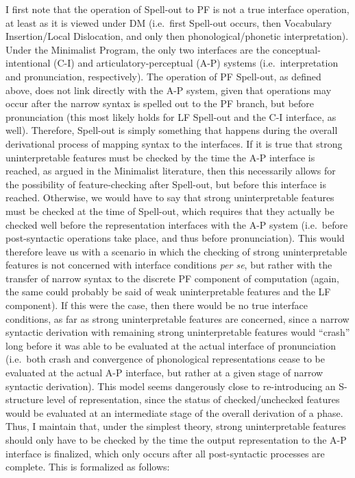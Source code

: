 I first note that the operation of Spell-out to PF is not a true interface operation, at least as it is viewed under DM (i.e.\ first Spell-out occurs, then Vocabulary Insertion/Local Dislocation, and only then phonological/phonetic interpretation). Under the Minimalist Program, the only two interfaces are the conceptual-intentional (C-I) and articulatory-perceptual (A-P) systems (i.e.\ interpretation and pronunciation, respectively). The operation of PF Spell-out, as defined above, does not link directly with the A-P system, given that operations may occur after the narrow syntax is spelled out to the PF branch, but before pronunciation (this most likely holds for LF Spell-out and the C-I interface, as well). Therefore, Spell-out is simply something that happens during the overall derivational process of mapping syntax to the interfaces. If it is true that strong uninterpretable features must be checked by the time the A-P interface is reached, as argued in the Minimalist literature, then this necessarily allows for the possibility of feature-checking after Spell-out, but before this interface is reached. Otherwise, we would have to say that strong uninterpretable features must be checked at the time of Spell-out, which requires that they actually be checked well before the representation interfaces with the A-P system (i.e.\ before post-syntactic operations take place, and thus before pronunciation). This would therefore leave us with a scenario in which the checking of strong uninterpretable features is not concerned with interface conditions {\it per se}, but rather with the transfer of narrow syntax to the discrete PF component of computation (again, the same could probably be said of weak uninterpretable features and the LF component). If this were the case, then there would be no true interface conditions, as far as strong uninterpretable features are concerned, since a narrow syntactic derivation with remaining strong uninterpretable features would ``crash'' long before it was able to be evaluated at the actual interface of pronunciation (i.e.\ both crash and convergence of phonological representations cease to be evaluated at the actual A-P interface, but rather at a given stage of narrow syntactic derivation). This model seems dangerously close to re-introducing an S-structure level of representation, since the status of checked/unchecked features would be evaluated at an intermediate stage of the overall derivation of a phase. Thus, I maintain that, under the simplest theory, strong uninterpretable features should only have to be checked by the time the output representation to the A-P interface is finalized, which only occurs after all post-syntactic processes are complete. This is formalized as follows:

